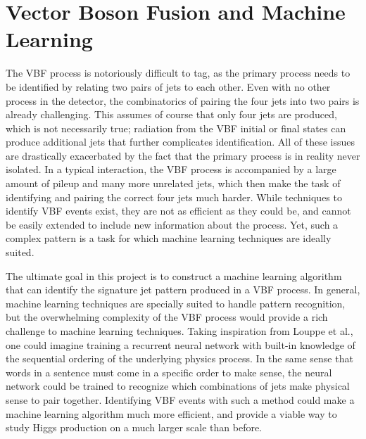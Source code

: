 \documentclass[12pt,letterpaper]{article}
\begin{document}
\section*{Vector Boson Fusion and Machine Learning}
    The VBF process is notoriously difficult to tag, as the primary process needs to be identified by relating two pairs of jets to each other. Even with no other process in the detector, the combinatorics of pairing the four jets into two pairs is already challenging. This assumes of course that only four jets are produced, which is not necessarily true; radiation from the VBF initial or final states can produce additional jets that further complicates identification. All of these issues are drastically exacerbated by the fact that the primary process is in reality never isolated. In a typical interaction, the VBF process is accompanied by a large amount of pileup and many more unrelated jets, which then make the task of identifying and pairing the correct four jets much harder. While techniques to identify VBF events exist, they are not as efficient as they could be, and cannot be easily extended to include new information about the process. Yet, such a complex pattern is a task for which machine learning techniques are ideally suited.


    The ultimate goal in this project is to construct a machine learning algorithm that can identify the signature jet pattern produced in a VBF process. In general, machine learning techniques are specially suited to handle pattern recognition, but the overwhelming complexity of the VBF process would provide a rich challenge to machine learning techniques. Taking inspiration from Louppe et al.\cite{Louppe:2017ipp}, one could imagine training a recurrent neural network with built-in knowledge of the sequential ordering of the underlying physics process. In the same sense that words in a sentence must come in a specific order to make sense, the neural network could be trained to recognize which combinations of jets make physical sense to pair together. Identifying VBF events with such a method could make a machine learning algorithm much more efficient, and provide a viable way to study Higgs production on a much larger scale than before.
\end{document}
